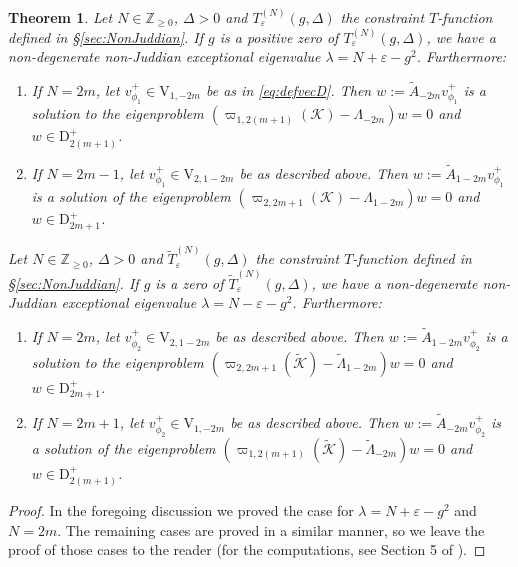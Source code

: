 \documentclass[11pt]{article}
\numberwithin{equation}{section}
\newcommand{\Z}{\mathbb{Z}} %
\newcommand{\e}{\varepsilon}
\newcommand{\RpnSymbol}[1]{\bm{\mathrm{#1}}}
\newcommand{\rV}{\RpnSymbol{V}}
\newcommand{\rD}{\RpnSymbol{D}}
\theoremstyle{plain}
\newtheorem{thm}{Theorem}[section]
\theoremstyle{definition}
\theoremstyle{remark}
\begin{document}
\begin{thm} \label{thm:eigenproblem}
  Let \(N \in \Z_{\geq 0}\), \(\Delta >0\) and \( T_\e^{(N)}(g,\Delta)\) the constraint $T$-function defined in \S \ref{sec:NonJuddian}.
  If \(g\) is a positive zero of \( T_\e^{(N)}(g,\Delta)\), we have a non-degenerate non-Juddian exceptional eigenvalue \( \lambda = N + \e - g^2 \).
  Furthermore:
  \begin{enumerate}[$(1)$]
  \item If \(N=2m\), let \(v^+_{\phi_1} \in \rV_{1,-2m}\) be as in \eqref{eq:defvecD}.
    Then $w:= \tilde{A}_{-2m} v^+_{\phi_1}$ is a solution to the eigenproblem
    \((\varpi_{1,2(m+1)}(\mathcal{K})- \Lambda_{-2m}) w = 0\)
    and $w \in \rD^+_{2(m+1)}$.
  \item If \(N=2m-1\), let \(v^+_{\phi_1} \in \rV_{2,1-2m}\) be as described above.
    Then $w:= \tilde{A}_{1-2m} v^+_{\phi_1}$ is a solution of the eigenproblem
    \((\varpi_{2,2 m+1}(\mathcal{K})- \Lambda_{1-2m}) w = 0\)
    and $w \in \rD^+_{2 m+1}$.
  \end{enumerate}
  Let \(N \in \Z_{\geq 0}\), \(\Delta >0\) and \( \tilde{T}_\e^{(N)}(g,\Delta)\) the constraint $T$-function defined in \S \ref{sec:NonJuddian}.
  If \(g\) is a zero of \( \tilde{T}_\e^{(N)}(g,\Delta)\), we have a non-degenerate non-Juddian exceptional eigenvalue \( \lambda = N - \e - g^2 \).
  Furthermore:
  \begin{enumerate}[$(1)$]
  \item If \(N=2m\), let \(v^+_{\phi_2} \in \rV_{2,1-2m}\) be as described above.
    Then $w:= \tilde{A}_{1-2m} v^+_{\phi_2}$ is a solution to the eigenproblem
    \( (\varpi_{2,2m+1}(\tilde{\mathcal{K}})- \tilde{\Lambda}_{1-2m}) w = 0 \)
    and $w  \in \rD^+_{2m + 1}$.
  \item If \(N=2m+1\), let \(v^+_{\phi_2} \in \rV_{1,-2 m}\) be as described above.
    Then $w:= \tilde{A}_{-2m} v^+_{\phi_2}$ is a solution of the eigenproblem
    \( (\varpi_{1,2(m+1)}(\tilde{\mathcal{K}})- \tilde{\Lambda}_{-2m}) w = 0 \)
    and \(w \in \rD^+_{2(m+1)}\).
  \end{enumerate}
 \end{thm}

 \begin{proof}
   In the foregoing discussion we proved the case for \( \lambda = N + \e - g^2 \) and \(N= 2m \). The remaining cases are proved in a similar manner,
   so we leave the proof of those cases to the reader (for the computations, see Section 5 of \cite{W2016JPA}). 
 \end{proof}
\end{document}
